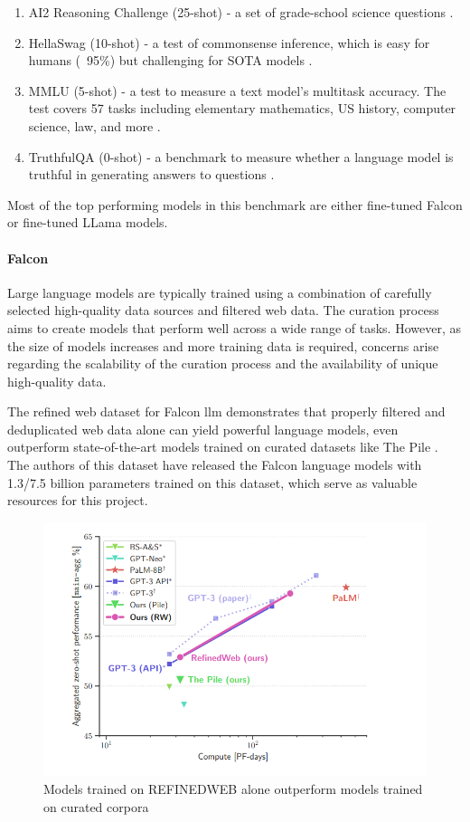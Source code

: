\documentclass[a4paper,12pt]{article}
\begin{document}
\begin{enumerate}
	\item AI2 Reasoning Challenge (25-shot) - a set of grade-school science questions \cite{AI2}.
	\item HellaSwag (10-shot) - a test of commonsense inference, which is easy for humans (~95\%) but challenging for SOTA models \cite{hellaswag}. 
	\item MMLU (5-shot) - a test to measure a text model’s multitask accuracy. The test covers 57 tasks including elementary mathematics, US history, computer science, law, and more \cite{MMLU}.
	\item TruthfulQA (0-shot) - a benchmark to measure whether a language model is truthful in generating answers to questions \cite{truthfulqa}.
\end{enumerate}

Most of the top performing models in this benchmark are either fine-tuned Falcon \cite{falcon} or fine-tuned LLama \cite{llama} models.

\paragraph*{Falcon}
Large language models are typically trained using a combination of carefully selected high-quality data sources and filtered web data. 
The curation process aims to create models that perform well across a wide range of tasks. 
However, as the size of models increases and more training data is required, concerns arise regarding the scalability of the curation process and the availability of unique high-quality data.

The refined web dataset for Falcon llm \cite{falcondataset} demonstrates that properly filtered and deduplicated web data alone can yield powerful language models, 
even outperform state-of-the-art models trained on curated datasets like The Pile \cite{pile}. 
The authors of this dataset\cite{falcondataset} have released the Falcon \cite{falcon} language models with 1.3/7.5 billion parameters trained on this dataset, 
which serve as valuable resources for this project.

\begin{figure}[htbp]
	\centering
	\includegraphics[width=.5\linewidth]{figures/falcon.png}
	\caption{Models trained on REFINEDWEB \cite{falcondataset} alone outperform models trained on curated corpora}
	\label{fig:falcon}
\end{figure}
\end{document}
